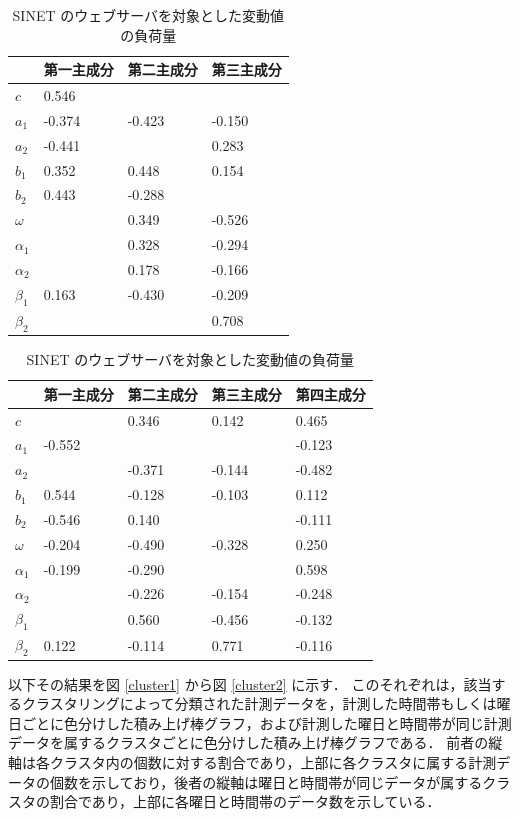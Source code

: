 \documentclass[a4j]{jarticle}
\begin{document}
\begin{table}[tb]
\begin{minipage}[t]{.45\textwidth}
\caption{SINET のウェブサーバを対象とした実測値の負荷量}
\begin{tabular}{|l|l|l|l|}
\hline
&第一主成分&第二主成分&第三主成分\\
\hline
$c$&0.546&& \\
$a_1$&-0.374&-0.423&-0.150\\
$a_2$&-0.441&&0.283\\
$b_1$&0.352&0.448&0.154\\
$b_2$&0.443&-0.288&\\
$\omega$&&0.349&-0.526 \\
$\alpha_1$&&0.328&-0.294\\
$\alpha_2$&&0.178&-0.166\\
$\beta_1$&0.163&-0.430&-0.209 \\
$\beta_2$&&&0.708\\
\hline
\end{tabular}
\end{minipage}
\hfill
\begin{minipage}[t]{.45\textwidth}
\caption{SINET のウェブサーバを対象とした変動値の負荷量}
\label{comp-loading-2}
\begin{tabular}{|l|l|l|l|l|}
\hline
&第一主成分&第二主成分&第三主成分&第四主成分\\
\hline
$c$&&0.346&0.142&0.465\\
$a_1$&-0.552&&&-0.123\\
$a_2$&&-0.371&-0.144&-0.482\\
$b_1$&0.544&-0.128&-0.103&0.112 \\
$b_2$&-0.546&0.140&&-0.111\\
$\omega$&-0.204&-0.490&-0.328&0.250 \\
$\alpha_1$&-0.199&-0.290&&0.598\\
$\alpha_2$&&-0.226&-0.154&-0.248\\
$\beta_1$&&0.560&-0.456&-0.132 \\
$\beta_2$&0.122&-0.114&0.771&-0.116\\
\hline
\end{tabular}
\end{minipage}
\end{table}

以下その結果を図 \ref{cluster1} から図 \ref{cluster2} に示す．
このそれぞれは，該当するクラスタリングによって分類された計測データを，計測した時間帯もしくは曜日ごとに色分けした積み上げ棒グラフ，および計測した曜日と時間帯が同じ計測データを属するクラスタごとに色分けした積み上げ棒グラフである．
前者の縦軸は各クラスタ内の個数に対する割合であり，上部に各クラスタに属する計測データの個数を示しており，後者の縦軸は曜日と時間帯が同じデータが属するクラスタの割合であり，上部に各曜日と時間帯のデータ数を示している．
\end{document}

